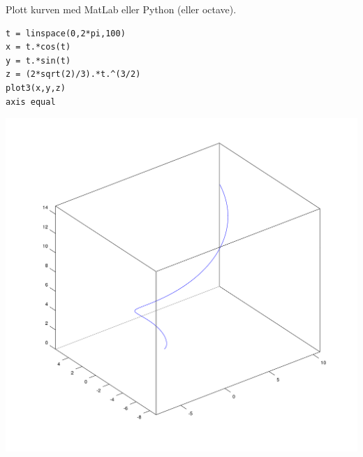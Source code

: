 Plott kurven med MatLab eller Python (eller octave).

\begin{lstlisting}
t = linspace(0,2*pi,100)
x = t.*cos(t)
y = t.*sin(t)
z = (2*sqrt(2)/3).*t.^(3/2)
plot3(x,y,z)
axis equal
\end{lstlisting}

\includegraphics[width=\textwidth]{./img/oppg2.png}
